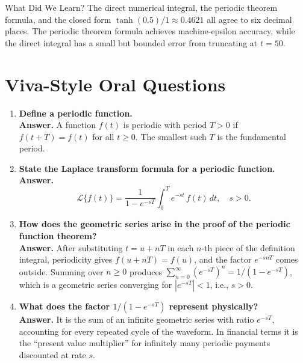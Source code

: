 \documentclass[12pt,a4paper]{article}
\begin{document}
\begin{learnbox}{What Did We Learn?}
The direct numerical integral, the periodic theorem formula, and the closed
form $\tanh(0.5)/1 \approx 0.4621$ all agree to six decimal places.  The
periodic theorem formula achieves machine-epsilon accuracy, while the direct
integral has a small but bounded error from truncating at $t = 50$.
\end{learnbox}

\section{Viva-Style Oral Questions}

\begin{enumerate}[label=\textbf{Q\arabic*.}, leftmargin=*, itemsep=8pt]

\item \textbf{Define a periodic function.} \\
\textbf{Answer.}  A function $f(t)$ is periodic with period $T > 0$ if
$f(t+T) = f(t)$ for all $t \geq 0$.  The smallest such $T$ is the
fundamental period.

\item \textbf{State the Laplace transform formula for a periodic function.} \\
\textbf{Answer.}
\[
  \mathcal{L}\{f(t)\}
  = \frac{1}{1 - e^{-sT}} \int_0^T e^{-st}\,f(t)\,dt, \quad s > 0.
\]

\item \textbf{How does the geometric series arise in the proof of the
              periodic function theorem?} \\
\textbf{Answer.}  After substituting $t = u + nT$ in each $n$-th piece of
the definition integral, periodicity gives $f(u+nT)=f(u)$, and the factor
$e^{-snT}$ comes outside.  Summing over $n \geq 0$ produces
$\sum_{n=0}^\infty (e^{-sT})^n = 1/(1-e^{-sT})$, which is a geometric
series converging for $|e^{-sT}|<1$, i.e., $s > 0$.

\item \textbf{What does the factor $1/(1-e^{-sT})$ represent physically?} \\
\textbf{Answer.}  It is the sum of an infinite geometric series with ratio
$e^{-sT}$, accounting for every repeated cycle of the waveform.
In financial terms it is the ``present value multiplier'' for infinitely
many periodic payments discounted at rate $s$.


\end{enumerate}
\end{document}
